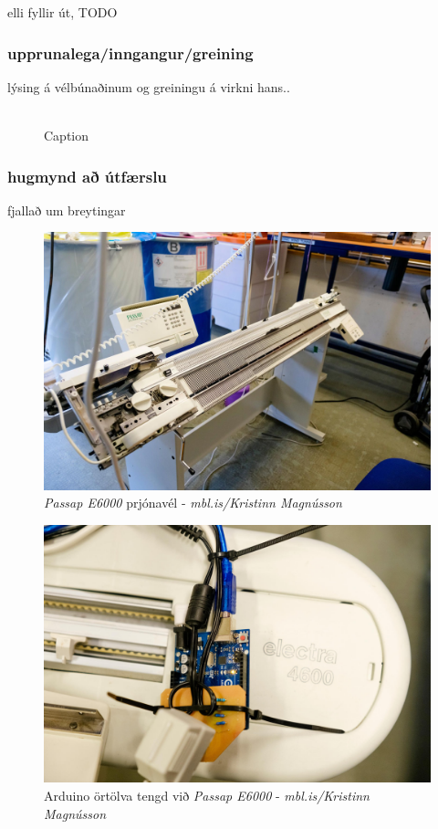 elli fyllir út, TODO
\subsubsection{upprunalega/inngangur/greining}
lýsing á vélbúnaðinum og greiningu á virkni hans.. \\\\
\begin{figure}[H]
    \centering
    \caption{Caption}
    \label{fig:enter-label}
\end{figure}

\subsubsection{hugmynd að útfærslu}
fjallað um breytingar


\begin{figure}
    \centering
    \includegraphics[width=0.5\linewidth]{myndir/elli/e6000.jpg}
    \caption{\textit{Passap E6000} prjónavél - \textit{mbl.is/Kristinn Magnússon}}
    \label{fig:e6000}
\end{figure}

\begin{figure}
    \centering
    \includegraphics[width=0.5\linewidth]{myndir/elli/electra4600.jpg}
    \caption{Arduino örtölva tengd við \textit{Passap E6000} - \textit{mbl.is/Kristinn Magnússon}}
    \label{fig:arduino}
\end{figure}